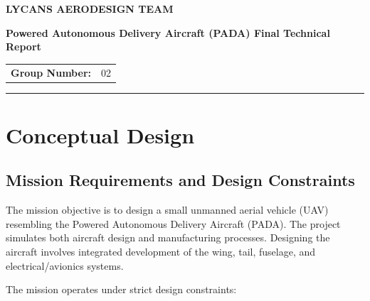 \documentclass[11pt,a4paper]{article}
\begin{document}

\begin{center}

    {\Large\bfseries\color{LycansBlue}
    LYCANS AERODESIGN TEAM}

    \vspace{0.5cm}

    {\LARGE\bfseries
    Powered Autonomous Delivery Aircraft (PADA) Final Technical Report}

    \vspace{0.5cm}

    \begin{tabular}{rl}
        \textbf{Group Number:} & 02 \\
    \end{tabular}

\end{center}

\vspace{0.5cm}

\hrule

\vspace{0.5cm}


\section{Conceptual Design}
\subsection{Mission Requirements and Design Constraints}
The mission objective is to design a small unmanned aerial vehicle (UAV) resembling the Powered Autonomous Delivery Aircraft (PADA). The project simulates both aircraft design and manufacturing processes. Designing the aircraft involves integrated development of the wing, tail, fuselage, and electrical/avionics systems.

The mission operates under strict design constraints:
\end{document}
